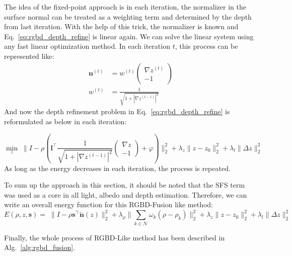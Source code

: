 The idea of the fixed-point approach is in each iteration, the normalizer in the surface normal can be treated as a weighting term and determined by the depth from last iteration.
With the help of this trick, the normalizer is known and Eq.~\ref{eq:rgbd_depth_refine} is linear again.
We can solve the linear system using any fast linear optimization method.
In each iteration $t$, this process can be represented like:
\begin{equation}
	\begin{split}
		\mathbf{n}^{(t)} &= w^{(t)}
		\begin{pmatrix} 
			 \nabla z^{(t)}\\ 
			 -1
	         \end{pmatrix}\\
	         w^{(t)} &=  \frac{1}{\sqrt{1 + |\nabla z^{(t-1)}|^2}}
	\end{split}
\end{equation}
And now the depth refinement problem in Eq.~\ref{eq:rgbd_depth_refine} is reformulated as below in each iteration:

\begin{equation}\label{eq:rgbd_depth_refine2}
	\min_{z} \; \lVert I - \rho (\mathbf{l}^\top \frac{1}{\sqrt{1 + |\nabla z^{(t-1)}|^2}} \begin{pmatrix} \nabla z\\ -1 \end{pmatrix} + \varphi) \rVert^2_2 + \lambda_z \lVert z - z_0\rVert^2_2 + \lambda_l \lVert \Delta z \rVert^2_2
\end{equation}
As long as the energy decreases in each iteration, the process is repeated.

To sum up the approach in this section, it should be noted that the SFS term was used as a core in all light, albedo and depth estimation.
Therefore, we can write an overall energy function for this RGBD-Fusion like method:
\begin{equation}
	E(\rho, z, \mathbf{s}) = \; \lVert I - \rho \mathbf{s}^\top\tilde{\mathbf{n}}(z) \rVert^2_2 + \lambda_{\rho} \lVert \sum_{k \in \mathcal{N}} \omega_k (\rho - \rho_k) \rVert^2_2 + \lambda_z \lVert z - z_0\rVert^2_2 + \lambda_l \lVert \Delta z \rVert^2_2
\end{equation}

Finally, the whole process of RGBD-Like method has been described in Alg.~\ref{alg:rgbd_fusion}. 



